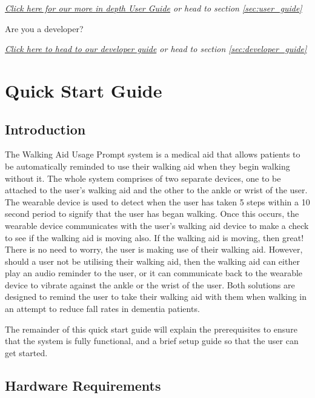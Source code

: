 		\textit{\hyperref[sec:user_guide]{Click here for our more in depth User Guide} or head to section \ref{sec:user_guide}}

		\vspace{1em}
		Are you a developer?

		\textit{\hyperref[sec:developer_guide]{Click here to head to our developer guide} or head to section \ref{sec:developer_guide}}

	\newpage
	\section{Quick Start Guide}
	\label{sec:quick_start_guide}

		\subsection{Introduction}
		\label{subsec:quick_start_guide_introduction}

			The Walking Aid Usage Prompt system is a medical aid that allows patients to be automatically reminded to use their walking aid when they begin walking without it. The whole system comprises of two separate devices, one to be attached to the user's walking aid and the other to the ankle or wrist of the user. The wearable device is used to detect when the user has taken 5 steps within a 10 second period to signify that the user has began walking. Once this occurs, the wearable device communicates with the user's walking aid device to make a check to see if the walking aid is moving also. If the walking aid is moving, then great! There is no need to worry, the user is making use of their walking aid. However, should a user not be utilising their walking aid, then the walking aid can either play an audio reminder to the user, or it can communicate back to the wearable device to vibrate against the ankle or the wrist of the user. Both solutions are designed to remind the user to take their walking aid with them when walking in an attempt to reduce fall rates in dementia patients.

			The remainder of this quick start guide will explain the prerequisites to ensure that the system is fully functional, and a brief setup guide so that the user can get started.

		\subsection{Hardware Requirements}
		\label{subsec:quick_start_guide_hardware}

